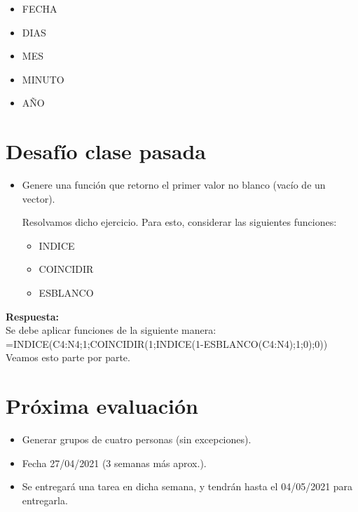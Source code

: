 \documentclass[12 pt,letterpaper]{article}
\newenvironment{solution}
{\begin{mdframed} \textbf{Respuesta:} \ \\}
	{\end{mdframed}}
\begin{document}
\begin{itemize}
	\item FECHA
	\item DIAS
	\item MES
	\item MINUTO
	\item AÑO
\end{itemize}

\section{Desafío clase pasada \faWarning}

\begin{itemize}
	\item Genere una función que retorno el primer valor no blanco (vacío de un vector). 
	
	Resolvamos dicho ejercicio. Para esto, considerar las siguientes funciones:
	
	\begin{itemize}
		\item INDICE
		\item COINCIDIR
		\item ESBLANCO
	\end{itemize}

\end{itemize}

\begin{solution}
	Se debe aplicar funciones de la siguiente manera:\\
	
	=INDICE(C4:N4;1;COINCIDIR(1;INDICE(1-ESBLANCO(C4:N4);1;0);0)) \\
	
	Veamos esto parte por parte.
\end{solution} 

\section{Próxima evaluación}

\begin{itemize}
	\item Generar grupos de cuatro personas (sin excepciones).
	
	\item Fecha 27/04/2021 (3 semanas más aprox.).
	
	\item Se entregará una tarea en dicha semana, y tendrán hasta el 04/05/2021 para entregarla. 
\end{itemize}
\end{document}
